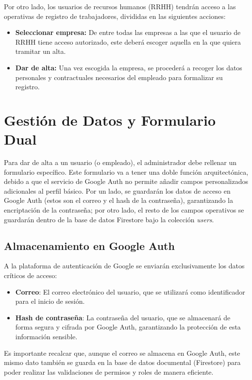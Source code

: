 Por otro lado, los usuarios de recursos humanos (RRHH) tendrán acceso a las operativas de registro de trabajadores, divididas en las siguientes acciones: \begin{itemize} \item \textbf{Seleccionar empresa:} De entre todas las empresas a las que el usuario de RRHH tiene acceso autorizado, este deberá escoger aquella en la que quiera tramitar un alta. \item \textbf{Dar de alta:} Una vez escogida la empresa, se procederá a recoger los datos personales y contractuales necesarios del empleado para formalizar su registro. \end{itemize}



\section{Gestión de Datos y Formulario Dual}

Para dar de alta a un usuario (o empleado), el administrador debe rellenar un formulario específico. Este formulario va a tener una doble función arquitectónica, debido a que el servicio de Google Auth no permite añadir campos personalizados adicionales al perfil básico. Por un lado, se guardarán los datos de acceso en Google Auth (estos son el correo y el hash de la contraseña), garantizando la encriptación de la contraseña; por otro lado, el resto de los campos operativos se guardarán dentro de la base de datos Firestore bajo la colección \textit{users}.

\subsection{Almacenamiento en Google Auth}

A la plataforma de autenticación de Google se enviarán exclusivamente los datos críticos de acceso:
\begin{itemize}
    \item \textbf{Correo}: El correo electrónico del usuario, que se utilizará como identificador para el inicio de sesión.
    \item \textbf{Hash de contraseña}: La contraseña del usuario, que se almacenará de forma segura y cifrada por Google Auth, garantizando la protección de esta información sensible.
\end{itemize}
Es importante recalcar que, aunque el correo se almacena en Google Auth, este mismo dato también se guarda en la base de datos documental (Firestore) para poder realizar las validaciones de permisos y roles de manera eficiente.

